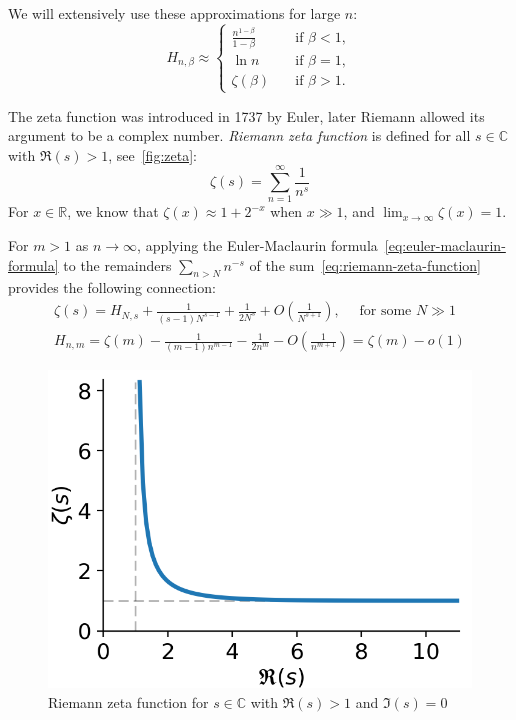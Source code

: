We will extensively use these approximations for large $n$:
\begin{equation}
    H_{n,\beta}\approx
    \begin{cases}
        \frac{n^{1-\beta}}{1-\beta} & \quad \text{if } \beta<1,\\
        \ln n & \quad \text{if } \beta=1,\\
        \zeta(\beta) & \quad \text{if } \beta>1.
    \end{cases}
\end{equation}

The zeta function was introduced in 1737 by Euler, later Riemann allowed its argument to be a complex number.
\textit{Riemann zeta function} is defined for all $s\in\mathbb{C}$ with $\Re(s)>1$, see~\autoref{fig:zeta}:
\begin{equation}
    \label{eq:riemann-zeta-function}
    \zeta(s)=\sum_{n=1}^{\infty}\frac{1}{n^s}
\end{equation}
For $x\in\mathbb{R}$, we know that $\zeta(x)\approx 1+2^{-x}$ when $x\gg 1$,
and $\lim_{x\to\infty}\zeta(x)=1$.

For $m>1$ as $n\to\infty$, applying the Euler-Maclaurin formula~\eqref{eq:euler-maclaurin-formula}
to the remainders $\sum_{n>N}{n^{-s}}$ of the sum~\eqref{eq:riemann-zeta-function}
provides the following connection:
\begin{gather}
    \zeta(s)=H_{N,s}+\frac{1}{(s-1)N^{s-1}}+\frac{1}{2N^s}+O\left(\frac{1}{N^{s+1}}\right),\quad\text{ for some }N\gg1\\
    H_{n,m}=\zeta(m)-\frac{1}{(m-1)n^{m-1}}-\frac{1}{2n^m}-O\left(\frac{1}{n^{m+1}}\right)
    =\zeta(m)-o(1)
\end{gather}

\begin{figure}
    \centering
    \includegraphics[scale=0.75]{images/generated/zeta}
    \caption[Riemann zeta function]{Riemann zeta function for $s\in\mathbb{C}$ with $\Re(s)>1$ and $\Im(s)=0$}
    \label{fig:zeta}
\end{figure}

